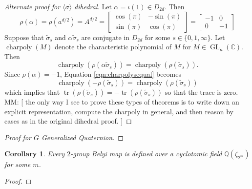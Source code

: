 \documentclass{dcthesis}
\newcommand{\CC}{\mathbb C}
\newcommand{\QQ}{\mathbb Q}
\newcommand{\mm}[1]{{\color{blue} \sf MM: [#1]}}
\newcommand{\wt}[1]{\widetilde{#1}}
\DeclareMathOperator{\GL}{GL}
\DeclareMathOperator{\charpoly}{charpoly}
\DeclareMathOperator{\Tr}{tr}
\numberwithin{equation}{section}
\newtheorem{corr}[equation]{Corollary}
\theoremstyle{definition}
\theoremstyle{remark}
\begin{document}
{{\begin{proof}[Alternate proof for $\langle\sigma\rangle$ dihedral]
      Let $\alpha = \iota(1)\in D_{2d}$.
      Then
      \begin{equation}
        \label{eqn:rhoofalpha}
        \rho(\alpha)
        =\rho(a^{d/2})
        =A^{d/2}
        =
        \begin{bmatrix}
          \cos(\pi)&-\sin(\pi)\\
          \sin(\pi)&\cos(\pi)
        \end{bmatrix}
        =
        \begin{bmatrix}
          -1&0\\
          0&-1
        \end{bmatrix}
      \end{equation}
      Suppose that $\wt{\sigma}_s$ and
      $\alpha\wt{\sigma}_s$ are
      conjugate in $D_{2d}$ for
      some $s\in \{0,1,\infty\}$.
      Let $\charpoly(M)$ denote the
      characteristic polynomial of $M$
      for $M\in\GL_n(\CC)$.
      Then
      \begin{equation}
        \label{eqn:charpolysequal}
        \charpoly(\rho(\alpha\wt{\sigma}_s))
        =\charpoly(\rho(\wt{\sigma}_s)).
      \end{equation}
      Since $\rho(\alpha)=-1$,
      Equation
      \ref{eqn:charpolysequal} becomes
      \begin{equation}
        \label{eqn:charpolysequalalpha}
        \charpoly(-\rho(\wt{\sigma}_s))=
        \charpoly(\rho(\wt{\sigma}_s))
      \end{equation}
      which implies that
      $\Tr(\rho(\wt{\sigma}_s)) =
      -\Tr(\rho(\wt{\sigma}_s))$
      so that the trace is zero.
      \mm{
         the only way I see to prove these types
         of theorems is to write down an
         explicit representation,
         compute the charpoly in general,
         and then reason by cases
         as in the original dihedral proof.
      }
    \end{proof}
    \begin{proof}[Proof for $G$ Generalized Quaternion]
    \end{proof}
    \begin{corr}
      Every $2$-group Belyi map is defined over a cyclotomic field
      $\QQ(\zeta_{2^m})$ for some $m$.
    \end{corr}
    \begin{proof}
    \end{proof}
  }
}
\end{document}
